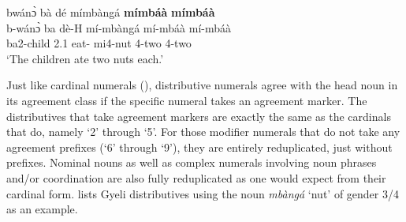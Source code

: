 \ea\label{nut}
  \glll   bwánɔ̀ bà dé mímbàngá {\bfseries mímbáà} {\bfseries mímbáà}\\
         b-wánɔ̀ ba dè-H mí-mbàngá mí-mbáà mí-mbáà\\
                ba2-child 2.{\PST}1 eat-{\R} mi4-nut 4-two 4-two \\
    \trans `The children ate two nuts each.'
\z

\noindent Just like cardinal numerals (), distributive numerals agree with the head noun in its agreement class if the specific numeral takes an agreement marker. The distributives that take agreement markers are exactly the same as the cardinals that do, namely `2' through `5'. For those modifier numerals that do not take any agreement prefixes (`6' through `9'), they are entirely reduplicated, just without prefixes. Nominal nouns as well as complex numerals involving noun phrases and/or coordination are also fully reduplicated as one would expect from their cardinal form.  lists Gyeli distributives using the noun {\itshape mbàngá} `nut' of gender 3/4 as an example.

